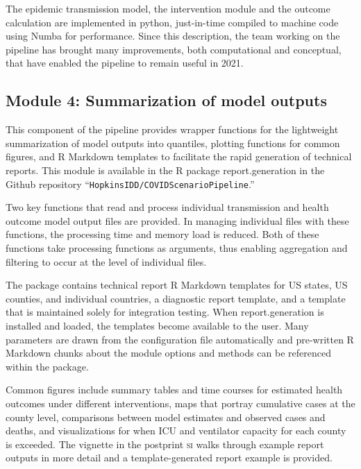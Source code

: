 {The epidemic transmission model, the intervention module and the outcome calculation are implemented in python, just-in-time compiled to machine code using Numba\cite{Lam:NumbaLLVMbasedPython:2015} for performance. Since this description, the team working on the pipeline has brought many improvements, both computational and conceptual, that have enabled the pipeline to remain useful in 2021.

\subsection{Module 4: Summarization of model outputs}
This component of the pipeline provides wrapper functions for the lightweight summarization of model outputs into quantiles, plotting functions for common figures, and R Markdown templates to facilitate the rapid generation of technical reports. This module is available in the R package report.generation in the Github repository “\verb|HopkinsIDD/COVIDScenarioPipeline|.”

Two key functions that read and process individual transmission and health outcome model output files are provided. In managing individual files with these functions, the processing time and memory load is reduced. Both of these functions take processing functions as arguments, thus enabling aggregation and filtering to occur at the level of individual files.

The package contains technical report R Markdown templates for US states, US counties, and individual countries, a diagnostic report template, and a template that is maintained solely for integration testing. When report.generation is installed and loaded, the templates become available to the user. Many parameters are drawn from the configuration file automatically and pre-written R Markdown chunks about the module options and methods can be referenced within the package.

Common figures include summary tables and time courses for estimated health outcomes under different interventions, maps that portray cumulative cases at the county level, comparisons between model estimates and observed cases and deaths, and visualizations for when ICU and ventilator capacity for each county is exceeded. The vignette in the postprint \textsc{si} walks through example report outputs in more detail and a template-generated report example is provided.

}
